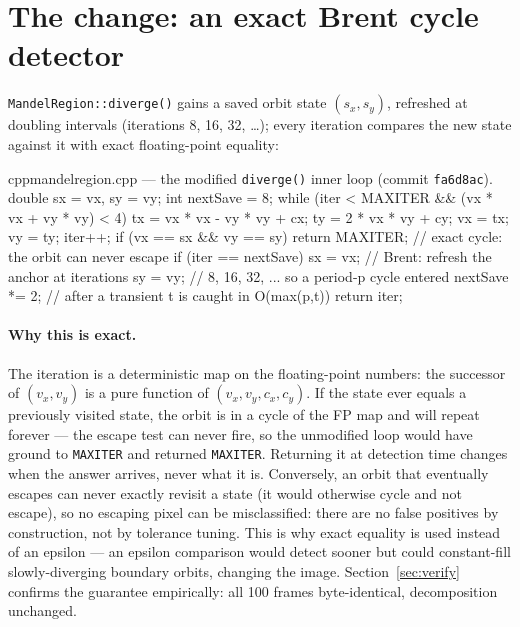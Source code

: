 \documentclass[
	english,
	letterpaper, oneside
]{article}
\begin{document}
\section{The change: an exact Brent cycle detector}
\label{sec:change}

\texttt{MandelRegion::diverge()} gains a saved orbit state $(s_x, s_y)$,
refreshed at doubling intervals (iterations 8, 16, 32, \dots); every iteration
compares the new state against it with exact floating-point equality:

\begin{sourcecode}{cpp}{mandelregion.cpp --- the modified \texttt{diverge()} inner loop (commit \texttt{fa6d8ac}).}
double sx = vx, sy = vy;
int nextSave = 8;
while (iter < MAXITER && (vx * vx + vy * vy) < 4)
  {
    tx = vx * vx - vy * vy + cx;
    ty = 2 * vx * vy + cy;
    vx = tx;
    vy = ty;
    iter++;
    if (vx == sx && vy == sy)
      return MAXITER;           // exact cycle: the orbit can never escape
    if (iter == nextSave)
      {
        sx = vx;                // Brent: refresh the anchor at iterations
        sy = vy;                // 8, 16, 32, ... so a period-p cycle entered
        nextSave *= 2;          // after a transient t is caught in O(max(p,t))
      }
  }
return iter;
\end{sourcecode}

\paragraph{Why this is exact.} The iteration is a deterministic map on the
floating-point numbers: the successor of $(v_x, v_y)$ is a pure function of
$(v_x, v_y, c_x, c_y)$. If the state ever equals a previously visited state,
the orbit is in a cycle of the FP map and will repeat forever --- the
escape test can never fire, so the unmodified loop would have ground to
\texttt{MAXITER} and returned \texttt{MAXITER}. Returning it at detection time
changes when the answer arrives, never what it is. Conversely,
an orbit that eventually escapes can never exactly revisit a state (it would
otherwise cycle and not escape), so no escaping pixel can be misclassified:
there are no false positives by construction, not by tolerance tuning.
This is why exact equality is used instead of an epsilon --- an epsilon
comparison would detect sooner but could constant-fill slowly-diverging
boundary orbits, changing the image. Section~\ref{sec:verify} confirms the
guarantee empirically: all 100 frames byte-identical, decomposition unchanged.
\end{document}
